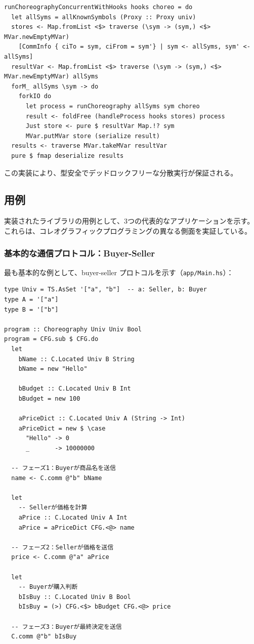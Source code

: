 \begin{verbatim}
runChoreographyConcurrentWithHooks hooks choreo = do
  let allSyms = allKnownSymbols (Proxy :: Proxy univ)
  stores <- Map.fromList <$> traverse (\sym -> (sym,) <$> MVar.newEmptyMVar)
    [CommInfo { ciTo = sym, ciFrom = sym'} | sym <- allSyms, sym' <- allSyms]
  resultVar <- Map.fromList <$> traverse (\sym -> (sym,) <$> MVar.newEmptyMVar) allSyms
  forM_ allSyms \sym -> do
    forkIO do
      let process = runChoreography allSyms sym choreo
      result <- foldFree (handleProcess hooks stores) process
      Just store <- pure $ resultVar Map.!? sym
      MVar.putMVar store (serialize result)
  results <- traverse MVar.takeMVar resultVar
  pure $ fmap deserialize results
\end{verbatim}

この実装により、型安全でデッドロックフリーな分散実行が保証される。

\subsection{用例}
\label{sect:impl-example}

実装されたライブラリの用例として、3つの代表的なアプリケーションを示す。これらは、コレオグラフィックプログラミングの異なる側面を実証している。

\subsubsection{基本的な通信プロトコル：Buyer-Seller}

最も基本的な例として、buyer-seller プロトコルを示す（\texttt{app/Main.hs}）：

\begin{verbatim}
type Univ = TS.AsSet '["a", "b"]  -- a: Seller, b: Buyer
type A = '["a"]
type B = '["b"]

program :: Choreography Univ Univ Bool
program = CFG.sub $ CFG.do
  let
    bName :: C.Located Univ B String
    bName = new "Hello"

    bBudget :: C.Located Univ B Int
    bBudget = new 100

    aPriceDict :: C.Located Univ A (String -> Int)
    aPriceDict = new $ \case
      "Hello" -> 0
      _       -> 10000000

  -- フェーズ1：Buyerが商品名を送信
  name <- C.comm @"b" bName

  let
    -- Sellerが価格を計算
    aPrice :: C.Located Univ A Int
    aPrice = aPriceDict CFG.<@> name

  -- フェーズ2：Sellerが価格を送信
  price <- C.comm @"a" aPrice

  let
    -- Buyerが購入判断
    bIsBuy :: C.Located Univ B Bool
    bIsBuy = (>) CFG.<$> bBudget CFG.<@> price

  -- フェーズ3：Buyerが最終決定を送信
  C.comm @"b" bIsBuy
\end{verbatim}

